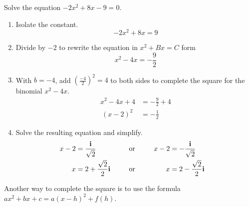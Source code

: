 	\begin{example}
		Solve the equation $-2x^2+8x-9=0$.
	\end{example}
	\begin{solution}\mbox{}
		\vspace{-0.25em}
		\begin{enumerate}[label={\textbf{\textup{Step \arabic*.}}~}]
			\item Isolate the constant.
			      \[-2x^2+8x=9\]
			\item Divide by $-2$ to rewrite the equation in $x^2+Bx=C$ form
			      \[x^2-4x=-\frac{9}{2}\]
			\item With $b=-4$, add $\left(\frac{-4}{2}\right)^2=4$ to both sides to complete the square for the binomial $x^2-4x$.
			      \[
				      \begin{split}
					      x^2-4x+4&=-\frac{9}{2}+4\\\
					      (x-2)^2&=-\frac{1}{2}
				      \end{split}
			      \]
			\item Solve the resulting equation and simplify.
			      \begin{alignat*}{3}
				      x-2 & =\frac{\ii}{\sqrt{2}}    &  & \ctc{or} & x-2 & =-\frac{\ii}{\sqrt{2}}   \\
				      x   & =2+\frac{\sqrt{2}}{2}\ii &  & \ctc{or} & x   & =2-\frac{\sqrt{2}}{2}\ii
			      \end{alignat*}
		\end{enumerate}
	\end{solution}

	\begin{note}
		Another way to complete the square is to use the formula $ax^2+bx+c=a(x-h)^2+f(h)$.
	\end{note}



